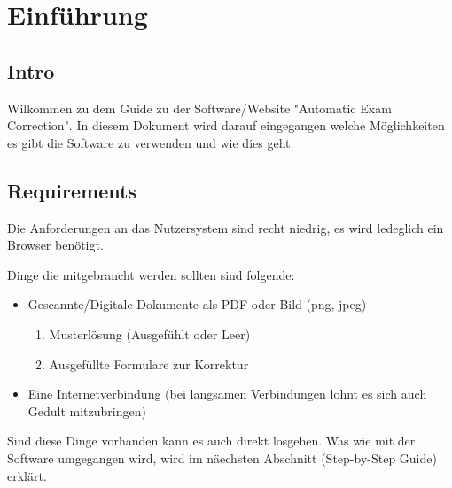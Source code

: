 \author{Tadd\"aus Nauheimer}
\chapter{Einf\"uhrung}

\section{Intro}

Wilkommen zu dem Guide zu der Software/Website "Automatic Exam Correction".
In diesem Dokument wird darauf eingegangen welche M\"oglichkeiten es gibt die Software zu verwenden und wie dies geht.

\section{Requirements}

Die Anforderungen an das Nutzersystem sind recht niedrig, es wird ledeglich ein Browser ben\"otigt.

Dinge die mitgebrancht werden sollten sind folgende:
\begin{itemize}
	\item Gescannte/Digitale Dokumente als PDF oder Bild (png, jpeg)
		\begin{enumerate}
			\item Musterl\"osung (Ausgef\"uhlt oder Leer)
			\item Ausgef\"ullte Formulare zur Korrektur
		\end{enumerate}
	\item Eine Internetverbindung (bei langsamen Verbindungen lohnt es sich auch Gedult mitzubringen)
\end{itemize}

Sind diese Dinge vorhanden kann es auch direkt losgehen.
Was wie mit der Software umgegangen wird, wird im n\"aechsten Abschnitt (Step-by-Step Guide) erkl\"art. 
